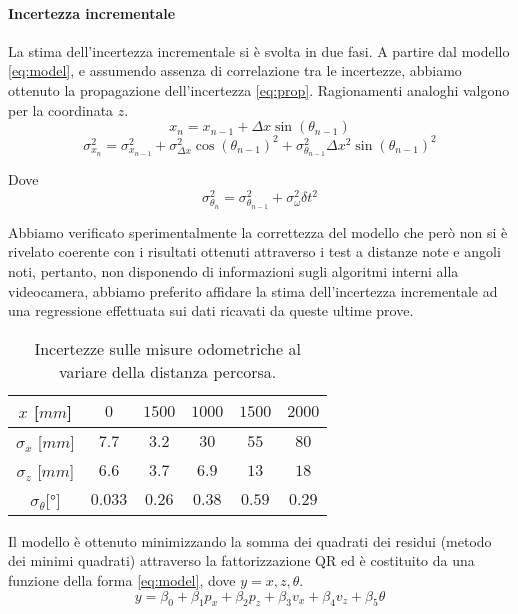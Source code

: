 \documentclass[
	a4paper, %
	10pt, %
]{LTJournalArticle}
\begin{document}
\paragraph{Incertezza incrementale} La stima dell'incertezza incrementale si è svolta in due fasi. A partire dal modello \ref{eq:model}, e assumendo assenza di correlazione tra le incertezze, abbiamo ottenuto la propagazione dell'incertezza \ref{eq:prop}. Ragionamenti analoghi valgono per la coordinata $z$.
\vspace{-4pt}
\begin{equation}
        x_n =x_{n-1}+\Delta x  \sin{(\theta_{n-1})}
    \label{eq:model}
\end{equation}
\vspace{-10pt}
\vspace{-4pt}
\begin{equation}
        \sigma_{x_n}^2 = \sigma_{x_{n-1}}^2 + \sigma_{\Delta x}^2 \cos{(\theta_{n-1})}^2 + \sigma_{\theta_{n-1}}^2 \Delta x ^2 \sin{(\theta_{n-1})}^2
        \label{eq:prop}
\end{equation}

Dove
\begin{equation}
    \sigma_{\theta_{n}}^2 = \sigma_{\theta_{n-1}}^2 + \sigma_{\omega}^2 \delta t^2
    \label{eq:angleprop}
\end{equation}

Abbiamo verificato sperimentalmente la correttezza del modello che però non si è rivelato coerente con i risultati ottenuti attraverso i test a distanze note e angoli noti, pertanto, non disponendo di informazioni sugli algoritmi interni alla videocamera, abbiamo preferito affidare la stima dell'incertezza incrementale ad una regressione effettuata sui dati ricavati da queste ultime prove.

\begin{table}[h]
    \centering
    \begin{tabular}{|c|c|c|c|c|c|}
    \hline
       $x$ [$mm$]          & $0$ & $1500$ & $1000$ & $1500$ & $2000$\\
    \hline
        $\sigma_x$ [$mm$]&  $7.7$ & $3.2$ & $30$ & $55$ & $80$\\
        $\sigma_z$ [$mm$]&  $6.6$ & $3.7$ & $6.9$ & $13$ & $18$\\
        $\sigma_{\theta} [$°$]$ & $0.033$ & $0.26$ & $0.38$ & $0.59$ & $0.29$\\
    \hline
    \end{tabular}
    \caption{Incertezze sulle misure odometriche al variare della distanza percorsa.}
    \label{tab:uncertainties}
\end{table}
\vspace{-15pt}
Il modello è ottenuto minimizzando la somma dei quadrati dei residui (metodo dei minimi quadrati) attraverso la fattorizzazione QR ed è costituito da una funzione della forma \ref{eq:model}, dove $y = {x,z,\theta}$.
\vspace{-10pt}
\begin{equation}
    y = \beta_0 + \beta_{1}p_{x} + \beta_{2}p_{z} + \beta_{3}v_{x} + \beta_{4}v_{z} + \beta_{5}\theta
    \label{eq:model}
\end{equation}
\end{document}
